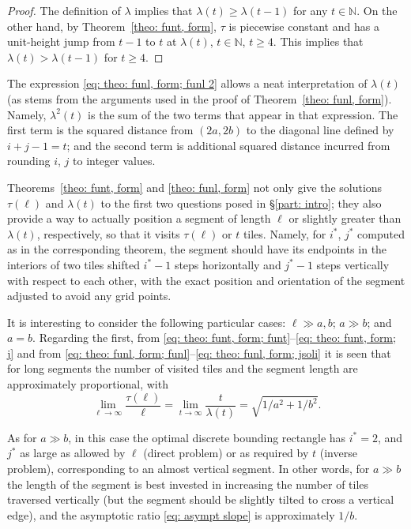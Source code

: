 \documentclass[12pt, a4paper]{article}
\newcommand{\funt}{\tau} %
\newcommand{\funl}{\lambda} %
\newcommand{\len}{\ell} %
\newcommand{\tiles}{t} %
\newcommand{\isoli}{i^\ast}
\newcommand{\jsoli}{j^\ast}
\begin{document}
\begin{proof}
The definition of $\funl$ implies that $\funl(\tiles) \geq \funl(\tiles-1)$ for any $\tiles \in \mathbb N$. On the other hand, by Theorem~\ref{theo: funt, form}, $\funt$ is piecewise constant and has a unit-height jump from $\tiles-1$ to $\tiles$ at $\funl(\tiles)$, $\tiles \in \mathbb N$, $\tiles \geq 4$. This implies that $\funl(\tiles) > \funl(\tiles-1)$ for $\tiles \geq 4$.
\end{proof}

The expression \eqref{eq: theo: funl, form; funl 2} allows a neat interpretation of $\funl(\tiles)$ (as stems from the arguments used in the proof of Theorem~\ref{theo: funl, form}). Namely, $\funl^2(\tiles)$ is the sum of the two terms that appear in that expression. The first term is the squared distance from $(2a, 2b)$ to the diagonal line defined by $i+j-1 = \tiles$; and the second term is additional squared distance incurred from rounding $i$, $j$ to integer values.

Theorems~\ref{theo: funt, form} and \ref{theo: funl, form} not only give the solutions $\funt(\len)$ and $\funl(\tiles)$ to the first two questions posed in \S\ref{part: intro}; they also provide a way to actually position a segment of length $\len$ or slightly greater than $\funl(\tiles)$, respectively, so that it visits $\funt(\len)$ or $\tiles$ tiles. Namely, for $\isoli$, $\jsoli$ computed as in the corresponding theorem, the segment should have its endpoints in the interiors of two tiles shifted $\isoli-1$ steps horizontally and $\jsoli-1$ steps vertically with respect to each other, with the exact position and orientation of the segment adjusted to avoid any grid points.

It is interesting to consider the following particular cases: $\len \gg a,b$; $a \gg b$; and $a=b$. Regarding the first, from \eqref{eq: theo: funt, form; funt}--\eqref{eq: theo: funt, form; j}
and from \eqref{eq: theo: funl, form; funl}--\eqref{eq: theo: funl, form; jsoli}
it is seen that for long segments the number of visited tiles and the segment length are approximately proportional, with
\begin{equation}
\label{eq: asympt slope}
\lim_{\len \rightarrow \infty} \frac{\funt(\len)}{\len}
= \lim_{\tiles \rightarrow \infty} \frac{\tiles}{\funl(\tiles)}
= \sqrt{1/a^2 + 1/b^2}.
\end{equation}

As for $a \gg b$, in this case the optimal discrete bounding rectangle has $\isoli = 2$, and $\jsoli$ as large as allowed by $\len$ (direct problem) or as required by $\tiles$ (inverse problem), corresponding to an almost vertical segment. In other words, for $a \gg b$ the length of the segment is best invested in increasing the number of tiles traversed vertically (but the segment should be slightly tilted to cross a vertical edge), and the asymptotic ratio \eqref{eq: asympt slope} is approximately $1/b$.
\end{document}
